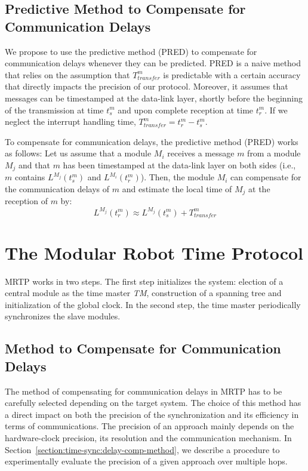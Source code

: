 \subsection{Predictive Method to Compensate for Communication Delays}
\label{section:time-sync:pred-method}

We propose to use the predictive method (PRED) to compensate for communication delays whenever they can be predicted. PRED is a naive method that relies on the assumption that $T_{transfer}^m$ is predictable with a certain accuracy that directly impacts the precision of our protocol. Moreover, it assumes that messages can be timestamped at the data-link layer, shortly before the beginning of the transmission at time $t_s^{m}$ and upon complete reception at time $t_r^{m}$. If we neglect the interrupt handling time, $T_{transfer}^m = t_r^{m} - t_s^{m}$.

To compensate for communication delays, the predictive method (PRED)  works as follows: Let us assume that a module $M_i$ receives a message $m$ from a module $M_j$ and that $m$ has been timestamped at the data-link layer on both sides (i.e., $m$ contains  $L^{M_j}(t_s^{m})$ and $L^{M_i}(t_r^{m})$). Then, the module $M_i$ can compensate for the communication delays of $m$ and estimate the local time of $M_j$ at the reception of $m$ by:
\begin{equation}
L^{M_j}(t_r^{m}) \approx L^{M_j}(t_s^{m}) + T_{transfer}^m
\end{equation}

\section{The Modular Robot Time Protocol}
\label{section:time-sync:protocol}

MRTP works in two steps. The first step initializes the system: election of a central module as the time master \textit{TM}, construction of a spanning tree and initialization of the global clock. In the second step, the time master periodically synchronizes the slave modules. 

\subsection{Method to Compensate for Communication Delays}

The method of compensating for communication delays in MRTP has to be carefully selected depending on the target system. The choice of this method has a direct impact on both the precision of the synchronization and its efficiency in terms of communications. The precision of an approach mainly depends on the hardware-clock precision, its resolution and the communication mechanism. In Section~\ref{section:time-sync:delay-comp-method}, we describe a procedure to experimentally evaluate the precision of a given approach over multiple hops.

